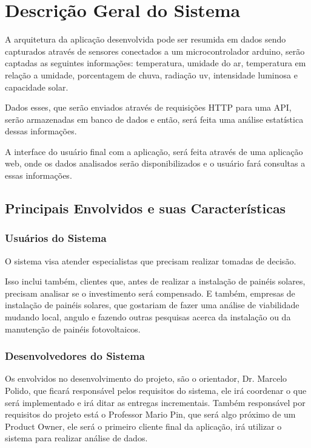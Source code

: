 \chapter{Descrição Geral do Sistema}

A arquitetura da aplicação desenvolvida pode ser resumida em dados sendo capturados através de sensores conectados a um microcontrolador arduino, serão captadas as seguintes informações: temperatura, umidade do ar, temperatura em relação a umidade, porcentagem de chuva, radiação uv, intensidade luminosa e capacidade solar.

Dados esses, que serão enviados através de requisições HTTP para uma API, serão armazenadas em banco de dados e então, será feita uma análise estatística dessas informações.

A interface do usuário final com a aplicação, será feita através de uma aplicação web, onde os dados analisados serão disponibilizados e o usuário fará consultas a essas informações.

\section{Principais Envolvidos e suas Características}

\subsection{Usuários do Sistema}

O sistema visa atender especialistas que precisam realizar tomadas de decisão.

Isso inclui também, clientes que, antes de realizar a instalação de painéis solares, precisam analisar se o investimento será compensado. E também, empresas de instalação de painéis solares, que gostariam de fazer uma análise de viabilidade mudando local, angulo e fazendo outras pesquisas acerca da instalação ou da manutenção de painéis fotovoltaicos.

\subsection{Desenvolvedores do Sistema}

Os envolvidos no desenvolvimento do projeto, são o orientador, Dr. Marcelo Polido, que ficará responsável pelos requisitos do sistema, ele irá coordenar o que será implementado e irá ditar as entregas incrementais. Também responsável por requisitos do projeto está o Professor Mario Pin, que será algo próximo de um Product Owner, ele será o primeiro cliente final da aplicação, irá utilizar o sistema para realizar análise de dados.

